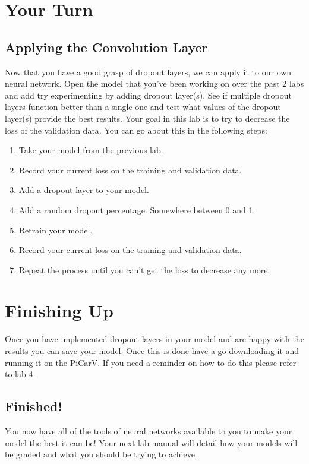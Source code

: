 \documentclass[11pt]{report}
\begin{document}


\chapter{Your Turn}
\section{Applying the Convolution Layer}
Now that you have a good grasp of dropout layers, we can apply it to our own neural network. Open the model that you've been working on over the past 2 labs and add try experimenting by adding dropout layer(s). See if multiple dropout layers function better than a single one and test what values of the dropout layer(s) provide the best results.
Your goal in this lab is to try to decrease the loss of the validation data. You can go about this in the following steps:

\begin{enumerate}
    \item{Take your model from the previous lab.}
    \item{Record your current loss on the training and validation data.}
    \item{Add a dropout layer to your model.}
    \item{Add a random dropout percentage. Somewhere between 0 and 1.}
    \item{Retrain your model.}
    \item{Record your current loss on the training and validation data.}
    \item{Repeat the process until you can't get the loss to decrease any more.}
\end{enumerate}


\pagebreak

\chapter{Finishing Up}

Once you have implemented dropout layers in your model and are happy with the results you can save your model. Once this is done have a go downloading it and running it on the PiCarV. If you need a reminder on how to do this please refer to lab 4.

\section{Finished!}
You now have all of the tools of neural networks available to you to make your model the best it can be! Your next lab manual will detail how your models will be graded and what you should be trying to achieve.
\end{document}
